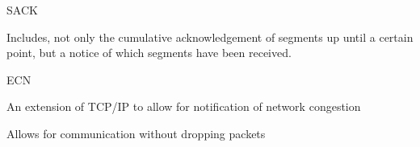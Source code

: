 \documentclass[main.tex]{subfiles}
\begin{document}
\begin{card}{SACK}
\item Includes, not only the cumulative acknowledgement of segments up until a certain point, but a notice of which segments have been received.
\end{card}

\begin{card}{ECN}
\item An extension of TCP/IP to allow for notification of network congestion
\item Allows for communication without dropping packets
\end{card}
\end{document}
